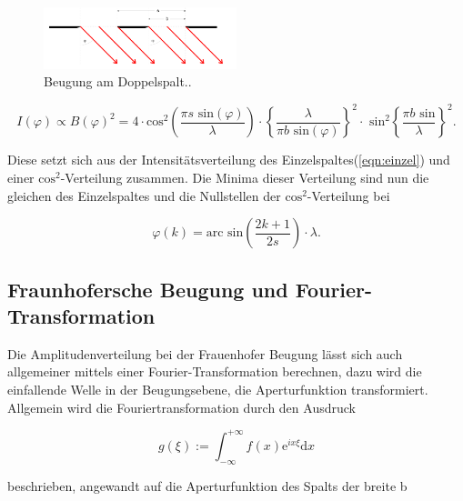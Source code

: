         \begin{figure}[ht]
            \centering
            \includegraphics[width=0.5\textwidth]{latex/images/Doppelspalt.PNG}
            \caption{Beugung am Doppelspalt.\protect \cite{V406}.}
            \label{img:Doppelspalt}
        \end{figure}

        \begin{equation}
            I(\varphi) \propto B(\varphi)^2 = 4 \cdot \text{cos}^2 \left( \frac{\pi s \text{ sin}(\varphi)}{\lambda} \right) \cdot 
            \left\{ \frac{\lambda}{\pi b \text{ sin}(\varphi)} \right\}^2 \cdot \text{ sin}^2 \left\{ \frac{ \pi b \text{ sin}}{\lambda} \right\}^2 .
        \end{equation}

        \noindent Diese setzt sich aus der Intensitätsverteilung des Einzelspaltes(\ref{eqn:einzel}) und einer $\text{cos}^2$-Verteilung zusammen. Die 
        Minima dieser Verteilung  sind nun die gleichen des Einzelspaltes und die Nullstellen der $\text{cos}^2$-Verteilung bei 

        \begin{equation*}
            \varphi(k) = \text{arc sin}\left( \frac{2k +1 }{2s} \right) \cdot \lambda .
        \end{equation*}

    \subsection{Fraunhofersche Beugung und Fourier-Transformation}

        \noindent Die Amplitudenverteilung bei der Frauenhofer Beugung lässt sich auch allgemeiner mittels einer Fourier-Transformation 
        berechnen, dazu wird die einfallende Welle in der Beugungsebene, die Aperturfunktion transformiert.
        Allgemein wird die Fouriertransformation durch den Ausdruck 

        \begin{equation}
            \label{eqn:Fourier}
            g(\xi) := \int_{-\infty}^{+\infty} f(x) \text{e}^{i x \xi} \text{d}x
        \end{equation}

        \noindent beschrieben, angewandt auf die Aperturfunktion des Spalts der breite b 

